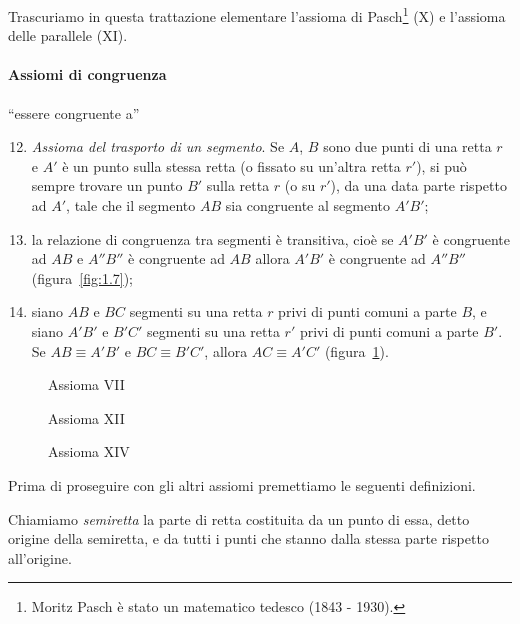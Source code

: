 \osservazione Trascuriamo in questa trattazione elementare l'assioma di Pasch\footnote{Moritz Pasch è stato un matematico tedesco (1843 - 1930).} (X) e l'assioma delle parallele (XI).

\paragraph{Assiomi di congruenza} ``essere congruente a''
\begin{enumerate}[label=\Roman{*}.]
\setcounter{enumi}{11}
\item \emph{Assioma del trasporto di un segmento}. Se $A$, $B$ sono due punti di una retta $r$ e $A'$ è un punto sulla stessa retta (o fissato su un'altra retta $r'$), si può sempre trovare un punto $B'$ sulla retta $r$ (o su $r'$), da una data parte rispetto ad $A'$, tale che il segmento $AB$ sia congruente al segmento $A'B'$;
\item la relazione di congruenza tra segmenti è transitiva, cioè se $A'B'$ è congruente ad $AB$ e $A''B''$ è congruente ad $AB$ allora $A'B'$ è congruente ad $A''B''$ (figura~\ref{fig:1.7});
\item siano $AB$ e $BC$ segmenti su una retta $r$ privi di punti comuni a parte $B$, e siano $A'B'$ e $B'C'$ segmenti su una retta $r'$ privi di punti comuni a parte $B'$. Se $AB\equiv A'B'$ e $BC\equiv B'C'$, allora  $AC\equiv A'C'$ (figura~\ref{fig:1.8}).
\end{enumerate}

\begin{figure}[b,t,h]
 \begin{minipage}[b]{.28\textwidth}
 \centering
 
 \caption{Assioma VII}\label{fig:1.6}
 \end{minipage}
 \begin{minipage}[b]{.34\textwidth}
 \centering
 
 \caption{Assioma XII}\label{fig:1.7}
 \end{minipage}
 \begin{minipage}[b]{.34\textwidth}
 \centering
 
 \caption{Assioma XIV}\label{fig:1.8}
 \end{minipage}
\end{figure}

Prima di proseguire con gli altri assiomi premettiamo le seguenti definizioni.
\begin{definizione}
Chiamiamo \emph{semiretta} la parte di retta costituita da un punto di essa, detto origine della semiretta, e da tutti i punti che stanno dalla stessa parte rispetto all'origine.
\end{definizione}

